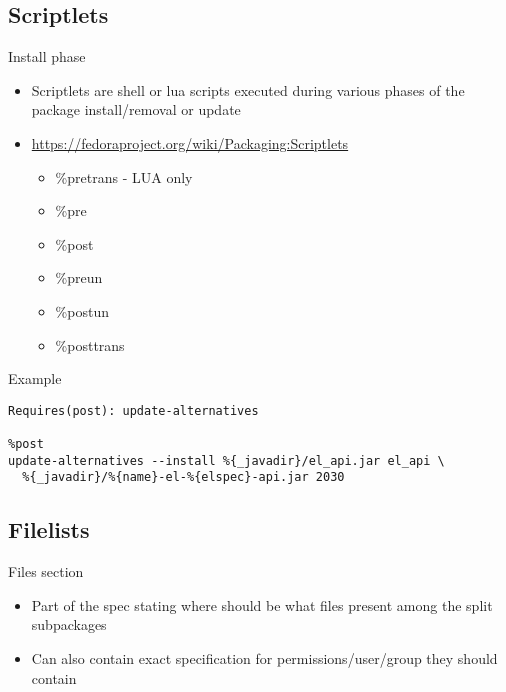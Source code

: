 \documentclass{beamer}
\begin{document}
\subsection{Scriptlets}

\begin{frame}[t]{Install phase}
	\begin{itemize}
    \item Scriptlets are shell or lua scripts executed during various phases of the package install/removal or update
    \item \url{https://fedoraproject.org/wiki/Packaging:Scriptlets}
        \begin{itemize}
        \item \%pretrans - LUA only
        \item \%pre
        \item \%post
        \item \%preun
        \item \%postun
        \item \%posttrans
        \end{itemize}
	\end{itemize}
\end{frame}

\begin{frame}[fragile]{Example}
	\begin{small}
\begin{verbatim}
Requires(post): update-alternatives

%post
update-alternatives --install %{_javadir}/el_api.jar el_api \
  %{_javadir}/%{name}-el-%{elspec}-api.jar 2030
\end{verbatim}
	\end{small}
\end{frame}

\subsection{Filelists}

\begin{frame}[t]{Files section}
	\begin{itemize}
	\item Part of the spec stating where should be what files present among the split subpackages
    \item Can also contain exact specification for permissions/user/group they should contain
	\end{itemize}
\end{frame}
\end{document}
